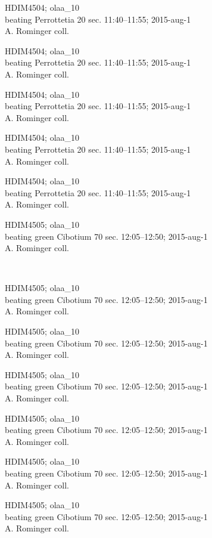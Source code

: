 \documentclass[2pt]{extarticle}
\begin{document}
\noindent
\parbox{0.16\textwidth}{\tiny \raggedright \rule[-0.3\baselineskip]{0pt}{10pt}HDIM4504; olaa\_10\\ beating Perrottetia 20 sec. 11:40--11:55; 2015-aug-1\\ A. Rominger coll.}
\parbox{0.16\textwidth}{\tiny \raggedright \rule[-0.3\baselineskip]{0pt}{10pt}HDIM4504; olaa\_10\\ beating Perrottetia 20 sec. 11:40--11:55; 2015-aug-1\\ A. Rominger coll.}
\parbox{0.16\textwidth}{\tiny \raggedright \rule[-0.3\baselineskip]{0pt}{10pt}HDIM4504; olaa\_10\\ beating Perrottetia 20 sec. 11:40--11:55; 2015-aug-1\\ A. Rominger coll.}
\parbox{0.16\textwidth}{\tiny \raggedright \rule[-0.3\baselineskip]{0pt}{10pt}HDIM4504; olaa\_10\\ beating Perrottetia 20 sec. 11:40--11:55; 2015-aug-1\\ A. Rominger coll.}
\parbox{0.16\textwidth}{\tiny \raggedright \rule[-0.3\baselineskip]{0pt}{10pt}HDIM4504; olaa\_10\\ beating Perrottetia 20 sec. 11:40--11:55; 2015-aug-1\\ A. Rominger coll.}
\parbox{0.16\textwidth}{\tiny \raggedright \rule[-0.3\baselineskip]{0pt}{10pt}HDIM4505; olaa\_10\\ beating green Cibotium 70 sec. 12:05--12:50; 2015-aug-1\\ A. Rominger coll.} \\ 
\vspace{0.001in} 

\noindent
\parbox{0.16\textwidth}{\tiny \raggedright \rule[-0.3\baselineskip]{0pt}{10pt}HDIM4505; olaa\_10\\ beating green Cibotium 70 sec. 12:05--12:50; 2015-aug-1\\ A. Rominger coll.}
\parbox{0.16\textwidth}{\tiny \raggedright \rule[-0.3\baselineskip]{0pt}{10pt}HDIM4505; olaa\_10\\ beating green Cibotium 70 sec. 12:05--12:50; 2015-aug-1\\ A. Rominger coll.}
\parbox{0.16\textwidth}{\tiny \raggedright \rule[-0.3\baselineskip]{0pt}{10pt}HDIM4505; olaa\_10\\ beating green Cibotium 70 sec. 12:05--12:50; 2015-aug-1\\ A. Rominger coll.}
\parbox{0.16\textwidth}{\tiny \raggedright \rule[-0.3\baselineskip]{0pt}{10pt}HDIM4505; olaa\_10\\ beating green Cibotium 70 sec. 12:05--12:50; 2015-aug-1\\ A. Rominger coll.}
\parbox{0.16\textwidth}{\tiny \raggedright \rule[-0.3\baselineskip]{0pt}{10pt}HDIM4505; olaa\_10\\ beating green Cibotium 70 sec. 12:05--12:50; 2015-aug-1\\ A. Rominger coll.}
\parbox{0.16\textwidth}{\tiny \raggedright \rule[-0.3\baselineskip]{0pt}{10pt}HDIM4505; olaa\_10\\ beating green Cibotium 70 sec. 12:05--12:50; 2015-aug-1\\ A. Rominger coll.} \\ 
\vspace{0.001in} 
\end{document}
